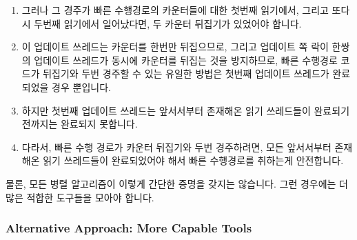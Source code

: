 \begin{enumerate}
\fi

\item	그러나 그 경주가 빠른 수행경로의 카운터들에 대한 첫번째 읽기에서,
	그리고 또다시 두번째 읽기에서 일어났다면, 두 카운터 뒤집기가 있었어야
	합니다.
\item	이 업데이트 쓰레드는 카운터를 한번만 뒤집으므로, 그리고 업데이트 쪽
	락이 한쌍의 업데이트 쓰레드가 동시에 카운터를 뒤집는 것을 방지하므로,
	빠른 수행경로 코드가 뒤집기와 두번 경주할 수 있는 유일한 방법은 첫번째
	업데이트 쓰레드가 완료되었을 경우 뿐입니다.
\item	하지만 첫번째 업데이트 쓰레드는 앞서서부터 존재해온 읽기 쓰레드들이
	완료되기 전까지는 완료되지 못합니다.
\item	다라서, 빠른 수행 경로가 카운터 뒤집기와 두번 경주하려면, 모든
	앞서서부터 존재해온 읽기 쓰레드들이 완료되었어야 해서 빠른 수행경로를
	취하는게 안전합니다.

\iffalse

\item	But if the race occurs on the fastpath's first read of the
	counters, and then again on its second read, there have
	to have been two counter flips.
\item	Because a given updater flips the counter only once, and
	because the update-side lock prevents a pair of updaters
	from concurrently flipping the counters, the only way that
	the fastpath code can race with a flip twice is if the
	first updater completes.
\item	But the first updater will not complete until after all
	pre-existing readers have completed.
\item	Therefore, if the fastpath races with a counter flip
	twice in succession, all pre-existing readers must have
	completed, so that it is safe to take the fastpath.

\fi

\end{enumerate}

물론, 모든 병렬 알고리즘이 이렇게 간단한 증명을 갖지는 않습니다.
그런 경우에는 더 많은 적합한 도구들을 모아야 합니다.

\iffalse

Of course, not all parallel algorithms have such simple proofs.
In such cases, it may be necessary to enlist more capable tools.

\fi

\subsubsection{Alternative Approach: More Capable Tools}
\label{sec:formal:Alternative Approach: More Capable Tools}

